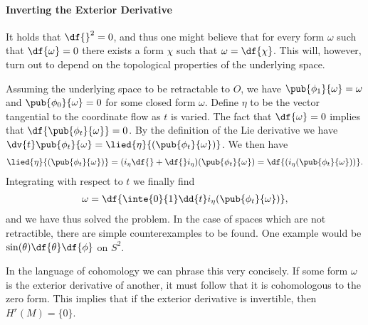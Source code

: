 \paragraph{Inverting the Exterior Derivative}
It holds that $\df{}^{2} = 0$, and thus one might believe that for every form $\omega$ such that $\df{\omega} = 0$ there exists a form $\chi$ such that $\omega = \df{\chi}$. This will, however, turn out to depend on the topological properties of the underlying space.

Assuming the underlying space to be retractable to $O$, we have $\pub{\phi_{1}}{\omega} = \omega$ and $\pub{\phi_{0}}{\omega} = 0$ for some closed form $\omega$. Define $\eta$ to be the vector tangential to the coordinate flow as $t$ is varied. The fact that $\df{\omega} = 0$ implies that $\df{\pub{\phi_{t}}{\omega}} = 0$. By the definition of the Lie derivative we have $\dv{t}\pub{\phi_{t}}{\omega} = \lied{\eta}{(\pub{\phi_{t}}{\omega})}$. We then have
\begin{align*}
	\lied{\eta}{(\pub{\phi_{t}}{\omega})} = (i_{\eta}\df{} + \df{}i_{\eta})(\pub{\phi_{t}}{\omega}) = \df{(i_{\eta}(\pub{\phi_{t}}{\omega}))}.
\end{align*}
Integrating with respect to $t$ we finally find
\begin{align*}
	\omega = \df{\inte{0}{1}\dd{t}i_{\eta}(\pub{\phi_{t}}{\omega})},
\end{align*}
and we have thus solved the problem. In the case of spaces which are not retractible, there are simple counterexamples to be found. One example would be $\sin(\theta)\df{\theta}\df{\phi}$ on $S^{2}$.

In the language of cohomology we can phrase this very concisely. If some form $\omega$ is the exterior derivative of another, it must follow that it is cohomologous to the zero form. This implies that if the exterior derivative is invertible, then $H^{r}(M) = \{0\}$.